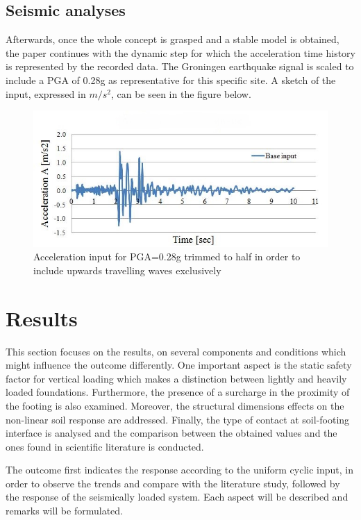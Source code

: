 \subsection{Seismic analyses}	 
Afterwards, once the whole concept is grasped and a stable model is obtained, the paper continues with the dynamic step for which the acceleration time history is represented by the recorded data. The Groningen earthquake signal is scaled to include a PGA of 0.28g as representative for this specific site. A sketch of the input, expressed in $m/s^2$, can be seen in the figure below.
	
	\begin{figure}[!h]
		\centering
		\includegraphics[width=0.7\linewidth]{"input_acc"}
		\caption{Acceleration input for PGA=0.28g trimmed to half in order to include upwards travelling waves exclusively}
		\label{inputacc}
	\end{figure}
\pagebreak

\newpage
\section{Results}
This section focuses on the results, on several components and conditions which might influence the outcome differently. One important aspect is the static safety factor for vertical loading which makes a distinction between lightly and heavily loaded foundations. Furthermore, the presence of a surcharge in the proximity of the footing is also examined. Moreover, the structural dimensions effects on the non-linear soil response are addressed. Finally, the type of contact at soil-footing interface is analysed and the comparison between the obtained values and the ones found in scientific literature is conducted.

The outcome first indicates the response according to the uniform cyclic input, in order to observe the trends and compare with the literature study, followed by the response of the seismically loaded system. Each aspect will be described and remarks will be formulated.

